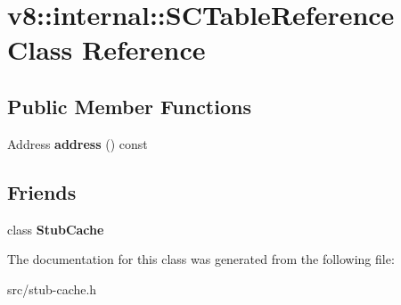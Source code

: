 \hypertarget{classv8_1_1internal_1_1_s_c_table_reference}{}\section{v8\+:\+:internal\+:\+:S\+C\+Table\+Reference Class Reference}
\label{classv8_1_1internal_1_1_s_c_table_reference}
\subsection*{Public Member Functions}
\begin{DoxyCompactItemize}
\item 
\hypertarget{classv8_1_1internal_1_1_s_c_table_reference_a9ef72f9ebe8c83cf2706d426b8cb942e}{}Address {\bfseries address} () const \label{classv8_1_1internal_1_1_s_c_table_reference_a9ef72f9ebe8c83cf2706d426b8cb942e}

\end{DoxyCompactItemize}
\subsection*{Friends}
\begin{DoxyCompactItemize}
\item 
\hypertarget{classv8_1_1internal_1_1_s_c_table_reference_a9dd0864bf7d020620606b5f3e1a0452f}{}class {\bfseries Stub\+Cache}\label{classv8_1_1internal_1_1_s_c_table_reference_a9dd0864bf7d020620606b5f3e1a0452f}

\end{DoxyCompactItemize}


The documentation for this class was generated from the following file\+:\begin{DoxyCompactItemize}
\item 
src/stub-\/cache.\+h\end{DoxyCompactItemize}
